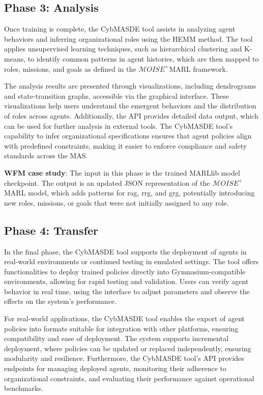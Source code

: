 \documentclass[sigconf,anonymous]{aamas}
\begin{document}
\subsection{Phase 3: Analysis}

Once training is complete, the CybMASDE tool assists in analyzing agent behaviors and inferring organizational roles using the HEMM method. The tool applies unsupervised learning techniques, such as hierarchical clustering and K-means, to identify common patterns in agent histories, which are then mapped to roles, missions, and goals as defined in the $\mathcal{M}OISE^+$MARL framework.

The analysis results are presented through visualizations, including dendrograms and state-transition graphs, accessible via the graphical interface. These visualizations help users understand the emergent behaviors and the distribution of roles across agents. Additionally, the API provides detailed data output, which can be used for further analysis in external tools. The CybMASDE tool's capability to infer organizational specifications ensures that agent policies align with predefined constraints, making it easier to enforce compliance and safety standards across the MAS.

\textbf{WFM case study}: The input in this phase is the trained MARLlib model checkpoint. The output is an updated JSON representation of the $\mathcal{M}OISE^+$MARL model, which adds patterns for rag, rrg, and grg, potentially introducing new roles, missions, or goals that were not initially assigned to any role.

\subsection{Phase 4: Transfer}

In the final phase, the CybMASDE tool supports the deployment of agents in real-world environments or continued testing in emulated settings. The tool offers functionalities to deploy trained policies directly into Gymnasium-compatible environments, allowing for rapid testing and validation. Users can verify agent behavior in real time, using the interface to adjust parameters and observe the effects on the system's performance.

For real-world applications, the CybMASDE tool enables the export of agent policies into formats suitable for integration with other platforms, ensuring compatibility and ease of deployment. The system supports incremental deployment, where policies can be updated or replaced independently, ensuring modularity and resilience. Furthermore, the CybMASDE tool's API provides endpoints for managing deployed agents, monitoring their adherence to organizational constraints, and evaluating their performance against operational benchmarks.
\end{document}
